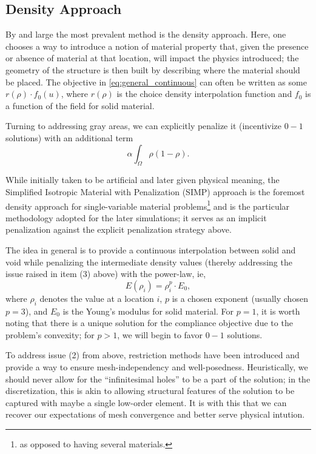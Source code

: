 \subsection{Density Approach}

By and large the most prevalent method is the density approach. Here, one chooses a way to introduce a notion
of material property that, given the presence or absence of material at that location, will impact the
physics introduced; the geometry of the structure is then built by describing where the material should be placed.
The objective in \autoref{eq:general_continuous} can often be written as some
$r(\rho) \cdot f_0(u)$, where $r(\rho)$ is the choice density interpolation function and $f_0$ is
a function of the field for solid material.\cite{bendsoe_sigmund_topopt}

Turning to addressing gray areas, we can explicitly penalize it (incentivize $0-1$ solutions) with an additional term
\begin{equation}\label{eq:explicit_penal}
    \alpha \int_\Omega \rho(1 - \rho).
\end{equation}

While initially taken to be artificial and later given physical meaning,\cite{sigmund_maute_2013} the Simplified Isotropic
Material with Penalization (SIMP) approach is the foremost density approach for single-variable material problems\footnote{
    as opposed to having several materials.
}
and is the particular methodology adopted for the later simulations; it serves as an implicit penalization against
the explicit penalization strategy above.

The idea in general is to provide a continuous interpolation between solid and void while penalizing the intermediate
density values (thereby addressing the issue raised in item (3) above) with the power-law, ie,
\begin{equation*}
    E(\rho_i) = \rho_i^p \cdot E_0,
\end{equation*}
where $\rho_i$ denotes the value at a location $i$, $p$ is a chosen exponent (usually chosen $p=3$), and $E_0$
is the Young's modulus for solid material. For $p=1$, it is worth noting that there is a unique solution for
the compliance objective due to the problem's convexity; for $p>1$, we will begin to favor $0-1$ solutions.

To address issue (2) from above, restriction methods have been introduced and provide a way to ensure mesh-independency
and well-posedness. Heuristically, we should never allow for the ``infinitesimal holes'' to be a part of the solution;
in the discretization, this is akin to allowing structural features of the solution to be captured with maybe a single
low-order element. It is with this that we can recover our expectations of mesh convergence and better serve physical
intution.

